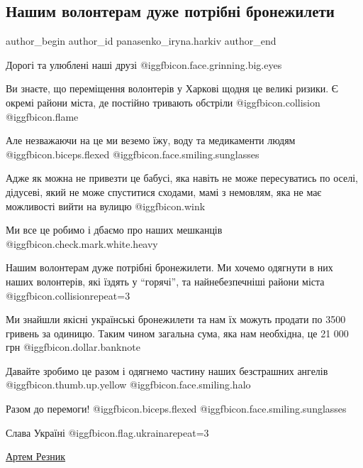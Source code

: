  
 
 
 
 
 
\subsection{Нашим волонтерам дуже потрібні бронежилети}
\label{sec:25_04_2022.fb.panasenko_iryna.harkiv.1.volontery_broniki}
 
\ifcmt
 author_begin
   author_id panasenko_iryna.harkiv
 author_end
\fi

Дорогі та улюблені наші друзі @igg{fbicon.face.grinning.big.eyes} 


Ви знаєте, що переміщення волонтерів у Харкові щодня це великі ризики.  Є
окремі райони міста, де постійно тривають обстріли @igg{fbicon.collision}
@igg{fbicon.flame} 

Але незважаючи на це ми веземо їжу, воду та медикаменти людям
@igg{fbicon.biceps.flexed}  @igg{fbicon.face.smiling.sunglasses} 

Адже як можна не привезти це бабусі, яка навіть не може пересуватись по оселі,
дідусеві, який не може спуститися сходами, мамі з немовлям, яка не має
можливості вийти на вулицю @igg{fbicon.wink} 

Ми все це робимо і дбаємо про наших мешканців
@igg{fbicon.check.mark.white.heavy} 

Нашим волонтерам дуже потрібні бронежилети. Ми хочемо одягнути в них наших
волонтерів, які їздять у \enquote{горячі}, та найнебезпечніші райони міста
@igg{fbicon.collision}{repeat=3} 

Ми знайшли якісні українські бронежилети та нам їх можуть продати по 3500
гривень за одиницю. Таким чином загальна сума, яка нам необхідна, це 21 000 грн
@igg{fbicon.dollar.banknote} 

Давайте зробимо це разом і одягнемо частину наших безстрашних ангелів
@igg{fbicon.thumb.up.yellow}  @igg{fbicon.face.smiling.halo} 

Разом до перемоги! @igg{fbicon.biceps.flexed}
@igg{fbicon.face.smiling.sunglasses} 

Слава Україні @igg{fbicon.flag.ukraina}{repeat=3}

\href{https://www.facebook.com/Artyom.Reznik}{Артем Резник}
